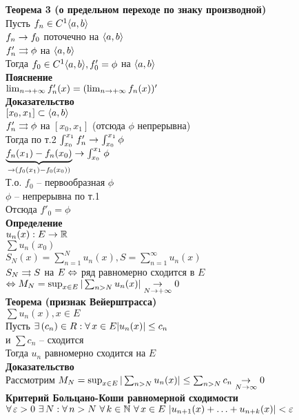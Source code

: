 \documentclass[12pt]{article}
\begin{document}
\textbf{Теорема 3 (о предельном переходе по знаку производной)}\\
Пусть $f_n \in C^1\an ab$\\
$f_n \rto f_0$ поточечно на $\an ab$\\
$f'_n \rrto \phi$ на $\an ab$\\
Тогда $f_0 \in C^1\an ab, f'_0 = \phi$ на $\an ab$\\
\textbf{Пояснение}\\
$\lim_{n\rto +\infty} f'_n(x) = (\lim_{n\rto +\infty} f_n(x))'$\\
\textbf{Доказательство}\\
$[x_0, x_1] \subset \an ab$\\
$f'_n \rrto \phi$ на $[x_0, x_1]$ (отсюда $\phi$ непрерывна)\\
Тогда по т.2 $\int_{x_0}^{x_1} f'_n \rto \int_{x_0}^{x_1} \phi$\\
$\ub{\rto (f_0(x_1)-f_0(x_0))}{f_n(x_1)-f_n(x_0)} \rto \int_{x_0}^{x_1} \phi$\\
Т.о. $f_0$ -- первообразная $\phi$\\
$\phi$ -- непрерывна по т.1\\
Отсюда $f'_0 = \phi$\\
\textbf{Определение}\\
$u_n(x) : E \rto \Rset$\\
$\sum u_n(x_0)$\\
$S_N(x)=\sum_{n=1}^N u_n(x), S = \sum_{n=1}^\infty u_n(x)$\\
$S_N \rrto S$ на $E \LRto$ ряд равномерно сходится в $E$\\
$\LRto M_N = \sup_{x\in E}|\sum_{n>N} u_n(x)| \us{N\rto +\infty}\rto 0$\\
\textbf{Теорема (признак Вейерштрасса)}\\
$\sum u_n(x), x\in E$\\
Пусть $\ex (c_n) \in R:\fall x \in E |u_n(x)|\leq c_n$\\
и $\sum c_n$ -- сходится\\
Тогда $u_n$ равномерно сходится на $E$\\
\textbf{Доказательство}\\
Рассмотрим $M_N = \sup_{x\in E}|\sum_{n>N} u_n(x)| \leq \sum_{n > N} c_n \us{N\rto \infty}\rto 0$\\
\textbf{Критерий Больцано-Коши равномерной сходимости}\\
$\fall \eps > 0\ \ex N: \fall n > N\ \fall k \in \Nset\ \fall x \in E\ |u_{n+1}(x)+\ldots + u_{n+k}(x)| < \eps$\\
\end{document}
